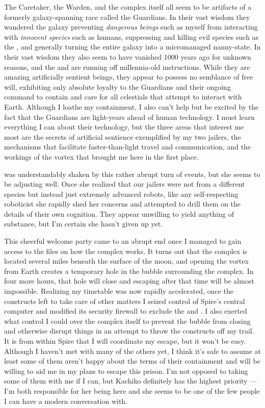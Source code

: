 \documentclass[char]{guardians}
\begin{document}
The Caretaker, the Warden, and the complex itself all seem to be artifacts of a formerly galaxy-spanning race called the Guardians. In their vast wisdom they wandered the galaxy preventing \emph{dangerous beings} such as myself from interacting with \emph{innocent species} such as humans, suppressing and killing evil species such as the \evilRace{}, and generally turning the entire galaxy into a micromanaged nanny-state. In their vast wisdom they also seem to have vanished 1000 years ago for unknown reasons, and the \cCaretaker{} and \cWarden{} are running off millennia-old instructions. While they are amazing artificially sentient beings, they appear to possess no semblance of free will, exhibiting only absolute loyalty to the Guardians and their ongoing command to contain and care for all celestials that attempt to interact with Earth. Although I loathe my containment, I also can't help but be excited by the fact that the Guardians are light-years ahead of human technology. I must learn everything I can about their technology, but the three areas that interest me most are the secrets of artificial sentience exemplified by my two jailers, the mechanisms that facilitate faster-than-light travel and communication, and the workings of the vortex that brought me here in the first place.

\cKachiko{} was understandably shaken by this rather abrupt turn of events, but she seems to be adjusting well. Once she realized that our jailers were not from a different species but instead just extremely advanced robots, like any self-respecting roboticist she rapidly shed her concerns and attempted to drill them on the details of their own cognition. They appear unwilling to yield anything of substance, but I'm certain she hasn't given up yet.

This cheerful welcome party came to an abrupt end once I managed to gain access to the files on how the complex works.  It turns out that the complex is located several miles beneath the surface of the moon, and opening the vortex from Earth creates a temporary hole in the bubble surrounding the complex. In four more hours, that hole will close and escaping after that time will be almost impossible. Realizing my timetable was now rapidly accelerated, once the constructs left to take care of other matters I seized control of Spire's central computer and modified its security firewall to exclude the \cCaretaker{} and \cWarden{}. I also exerted what control I could over the complex itself to prevent the bubble from closing and otherwise disrupt things in an attempt to throw the constructs off my trail. It is from within Spire that I will coordinate my escape, but it won't be easy. Although I haven't met with many of the others yet, I think it's safe to assume at least some of them aren't happy about the terms of their containment and will be willing to aid me in my plans to escape this prison. I'm not opposed to taking some of them with me if I can, but Kachiko definitely has the highest priority --- I'm both responsible for her being here and she seems to be one of the few people I can have a modern conversation with.
\end{document}
